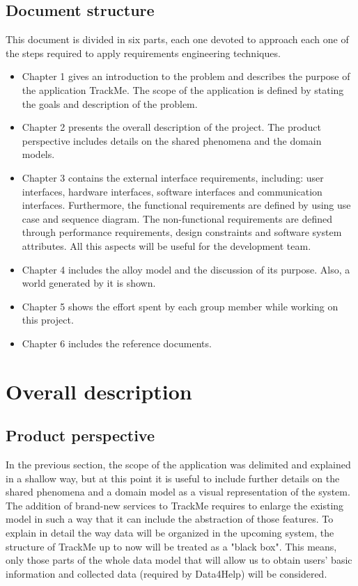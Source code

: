 \documentclass[12pt]{report}
\begin{document}
\section{Document structure}
This document is divided in six parts, each one devoted to approach each one of the steps required to apply requirements engineering techniques.
\begin{itemize}
\item Chapter 1 gives an introduction to the problem and describes the purpose of the application TrackMe. The scope of the application is defined by stating the goals and description of the problem.
\item Chapter 2 presents the overall description of the project. The product perspective includes details on the shared phenomena and the domain models.
\item Chapter 3 contains the external interface requirements, including: user interfaces, hardware interfaces, software interfaces and communication interfaces. Furthermore, the functional requirements are defined by using use case and sequence diagram. The non-functional requirements are defined through performance requirements, design constraints and software system attributes. All this aspects will be useful for the development team.
\item Chapter 4 includes the alloy model and the discussion of its purpose. Also, a world generated by it is shown.
\item Chapter 5 shows the effort spent by each group member while working on this project.
\item Chapter 6 includes the reference documents.
\end{itemize}

\chapter{Overall description}
\section{Product perspective}
In the previous section, the scope of the application was delimited and explained in a shallow way, but at this point it is useful to include further details on the shared phenomena and a domain model as a visual representation of the system.  \\

The addition of brand-new services to TrackMe requires to enlarge the existing model in such a way that it can include the abstraction of those features. To explain in detail the way data will be organized in the upcoming system, the structure of TrackMe up to now will be treated as a "black box". This means, only those parts of the whole data model that will allow us to obtain users' basic information and collected data (required by Data4Help) will be considered. \\
\end{document}
